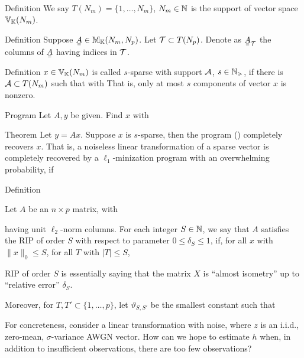 \Result
{Definition}
{
We say \(T (N_m) =\{1, \dotsc, N_m\}\), \(N_m \in \mathbb{N}\) is the support of vector space \(\mathbb{V}_{\mathbb{K}} (N_m)\).
}

\Result
{Definition}
{
Suppose \(\M{A} \in \MB{M}_{\MB{K}} (N_m, N_p)\).
Let \(\mathcal{T} \subset T (N_p)\).
Denote as \(\M{A}_{\MC{T}}\) the columns of \(\M{A}\) having indices in \(\mathcal{T}\).
}

\Result
{Definition}
{
\(x \in \mathbb{V}_{\mathbb{K}} (N_m)\) is called \(s\)-sparse with support \(\mathcal{A}\), \(s \in \mathbb{N_m}\), if there is \(\mathcal{A} \subset T (N_m)\) such that
%
with
%
That is, only at most \(s\) components of vector \(x\) is nonzero.
}

\Result
{Program}
{
Let \(A,y\) be given.
Find \(x\) with
%
%
}

\Result
{Theorem}
{
Let \(y =Ax\).
Suppose \(x\) is \(s\)-sparse, then the program () completely recovers \(x\).
That is, a noiseless linear transformation of a sparse vector is completely recovered by a \(\ell_1\)-minization program with an overwhelming probability, if
%
%
}



\Result
{Definition}
{
Let \(A\) be an \(n \times p\) matrix, with
%
%

having unit \(\ell_2\)-norm columns.
For each integer \(S \in \mathbb{N}\), we say that \(A\) satisfies the RIP of order \(S\) with respect to parameter \(0 \leq \delta_S \leq 1\), if, for all \(x\) with \(\|x\|_0 \leq S\), for all \(T\) with \(|T| \leq S\),
%
%
}

RIP of order \(S\) is essentially saying that the matrix \(X\) is ``almost isometry'' up to ``relative error'' \(\delta_S\).

Moreover, for \(T,T' \subset \{1, \dotsc, p \}\), let \(\vartheta_{S,S'}\) be the smallest constant such that
%
%



For concreteness, consider a linear transformation with noise,
%
%
where \(z\) is an i.i.d., zero-mean, \(\sigma\)-variance AWGN vector.
How can we hope to estimate \(h\) when, in addition to insufficient observations, there are too few observations?

